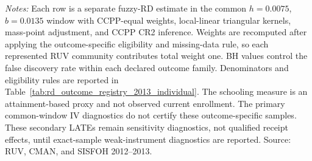 \begin{minipage}{0.98\linewidth}\footnotesize\textit{Notes:} Each row is a separate fuzzy-RD estimate in the common \(h=0.0075\), \(b=0.0135\) window with CCPP-equal weights, local-linear triangular kernels, mass-point adjustment, and CCPP CR2 inference. Weights are recomputed after applying the outcome-specific eligibility and missing-data rule, so each represented RUV community contributes total weight one. BH values control the false discovery rate within each declared outcome family. Denominators and eligibility rules are reported in Table~\ref{tab:rd_outcome_registry_2013_individual}. The schooling measure is an attainment-based proxy and not observed current enrollment. The primary common-window IV diagnostics do not certify these outcome-specific samples. These secondary LATEs remain sensitivity diagnostics, not qualified receipt effects, until exact-sample weak-instrument diagnostics are reported. Source: RUV, CMAN, and SISFOH 2012--2013.\end{minipage}
\endgroup
